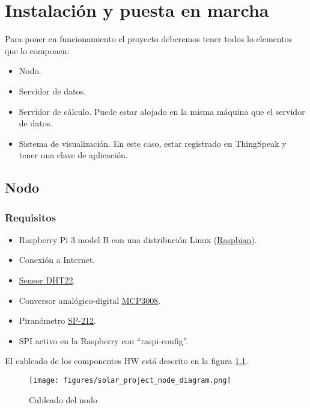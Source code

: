\cleardoublepage

\chapter{Instalación y puesta en marcha}
\label{makereference7}

Para poner en funcionamiento el proyecto deberemos tener todos lo elementos que lo componen:
\begin{itemize}
\item Nodo.
\item Servidor de datos.
\item Servidor de cálculo. Puede estar alojado en la misma máquina que el servidor de datos.
\item Sistema de visualización. En este caso, estar registrado en ThingSpeak y tener una clave de aplicación.
\end{itemize}

\section{Nodo}
\label{makereference7.1}
\subsection{Requisitos}
\label{makereference7.1.2}
	\begin{itemize}
		\item Raspberry Pi 3 model B con una distribución Linux (\href{https://www.raspberrypi.org/downloads/raspbian/}{Raspbian}).
		\item Conexión a Internet.
		\item \href{https://www.adafruit.com/product/385}{Sensor DHT22}.
		\item Conversor analógico-digital \href{https://www.adafruit.com/product/856}{MCP3008}.
		\item Piranómetro \href{https://www.apogeeinstruments.co.uk/content/SP-212-215-manual.pdf}{SP-212}.
		\item SPI activo en la Raspberry con ``raspi-config''.
	\end{itemize}

El cableado de los componentes HW está descrito en la figura \ref{wiring}.
\begin{figure}[htb]
	\begin{center}
		\texttt{[image: figures/solar\_project\_node\_diagram.png]}
		\caption{Cableado del nodo \label{wiring}}
	\end{center}
\end{figure}

